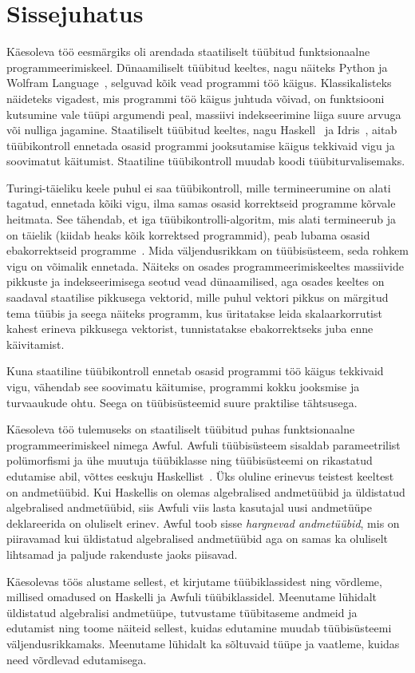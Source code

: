 \documentclass[12pt]{article}
\newcommand\peatykk[1]{
  \clearpage
  \section{#1}}
\begin{document}
  \peatykk{Sissejuhatus}
    Käesoleva töö eesmärgiks oli arendada staatiliselt tüübitud funktsionaalne programmeerimiskeel. Dünaamiliselt tüübitud keeltes, nagu näiteks Python ja Wolfram Language~\cite{Wol}, selguvad kõik vead programmi töö käigus. Klassikalisteks näideteks vigadest, mis programmi töö käigus juhtuda võivad, on funktsiooni kutsumine vale tüüpi argumendi peal, massiivi indekseerimine liiga suure arvuga või nulliga jagamine. Staatiliselt tüübitud keeltes, nagu Haskell~\cite{Gla} ja Idris~\cite{The_Idr}, aitab tüübikontroll ennetada osasid programmi jooksutamise käigus tekkivaid vigu ja soovimatut käitumist. Staatiline tüübikontroll muudab koodi tüübiturvalisemaks.

    Turingi-täieliku keele puhul ei saa tüübikontroll, mille termineerumine on alati tagatud, ennetada kõiki vigu, ilma samas osasid korrektseid programme kõrvale heitmata. See tähendab, et iga tüübikontrolli-algoritm, mis alati termineerub ja on täielik (kiidab heaks kõik korrektsed programmid), peab lubama osasid ebakorrektseid programme~\cite{Typ}. Mida väljendusrikkam on tüübisüsteem, seda rohkem vigu on võimalik ennetada. Näiteks on osades programmeerimiskeeltes massiivide pikkuste ja indekseerimisega seotud vead dünaamilised, aga osades keeltes on saadaval staatilise pikkusega vektorid, mille puhul vektori pikkus on märgitud tema tüübis ja seega näiteks programm, kus üritatakse leida skalaarkorrutist kahest erineva pikkusega vektorist, tunnistatakse ebakorrektseks juba enne käivitamist.

    Kuna staatiline tüübikontroll ennetab osasid programmi töö käigus tekkivaid vigu, vähendab see soovimatu käitumise, programmi kokku jooksmise ja turvaaukude ohtu. Seega on tüübisüsteemid suure praktilise tähtsusega.

    Käesoleva töö tulemuseks on staatiliselt tüübitud puhas funktsionaalne programmeerimiskeel nimega Awful. Awfuli tüübisüsteem sisaldab parameetrilist polümorfismi ja ühe muutuja tüübiklasse ning tüübisüsteemi on rikastatud edutamise abil, võttes eeskuju Haskellist~\cite{Giv}. Üks oluline erinevus teistest keeltest on andmetüübid. Kui Haskellis on olemas algebralised andmetüübid ja üldistatud algebralised andmetüübid, siis Awfuli viis lasta kasutajal uusi andmetüüpe deklareerida on oluliselt erinev. Awful toob sisse \textit{hargnevad andmetüübid}, mis on piiravamad kui üldistatud algebralised andmetüübid aga on samas ka oluliselt lihtsamad ja paljude rakenduste jaoks piisavad.

    Käesolevas töös alustame sellest, et kirjutame tüübiklassidest ning võrdleme, millised omadused on Haskelli ja Awfuli tüübiklassidel. Meenutame lühidalt üldistatud algebralisi andmetüüpe, tutvustame tüübitaseme andmeid ja edutamist ning toome näiteid sellest, kuidas edutamine muudab tüübisüsteemi väljendusrikkamaks. Meenutame lühidalt ka sõltuvaid tüüpe ja vaatleme, kuidas need võrdlevad edutamisega.
\end{document}
